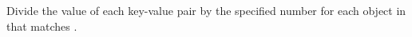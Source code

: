 Divide the value of each key-value pair by the specified number for each object
in  that matches .


